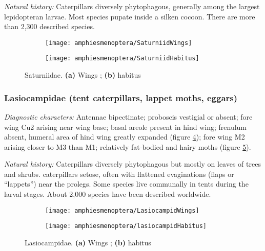 \noindent{}\textit{Natural history:} Caterpillars diversely phytophagous, generally among the largest lepidopteran larvae. Most species pupate inside a silken cocoon. There are more than 2,300 described species.

\begin{figure}[ht!]
    \centering
    \begin{subfigure}[ht!]{0.31\textwidth}
        \texttt{[image: amphiesmenoptera/SaturniidWings]}
        \caption{}
        \label{fig:saturniid1}
    \end{subfigure}
    \hfill
    \begin{subfigure}[ht!]{0.6\textwidth}
        \texttt{[image: amphiesmenoptera/SaturniidHabitus]}
        \caption{}
        \label{fig:saturniid2}
    \end{subfigure}
    \caption{Saturniidae. \textbf{(a)} Wings \citep[Fig. 345]{comstock1918wings}; \textbf{(b)} habitus \citep[][Plate 19, Fig. 1]{druce1900biologia}}\label{fig:saturniids}
\end{figure}

\subsubsection{Lasiocampidae (tent caterpillars, lappet moths, eggars)}
\noindent{}\textit{Diagnostic characters:} Antennae bipectinate; proboscis vestigial or absent; fore wing Cu2 arising near wing base; basal areole present in hind wing; frenulum absent, humeral area of hind wing greatly expanded (figure \ref{fig:lasiocampid1}); fore wing M2 arising closer to M3 than M1; relatively fat-bodied and hairy moths (figure \ref{fig:lasiocampid2}).\vspace{3mm}

\noindent{}\textit{Natural history:} Caterpillars diversely phytophagous but mostly on leaves of trees and shrubs. caterpillars setose, often with flattened evaginations (flaps or ``lappets'') near the prolegs. Some species live communally in tents during the larval stages. About 2,000 species have been described worldwide.

\begin{figure}[ht!]
    \centering
    \begin{subfigure}[ht!]{0.3\textwidth}
        \texttt{[image: amphiesmenoptera/LasiocampidWings]}
        \caption{}
        \label{fig:lasiocampid1}
    \end{subfigure}
    \hfill
    \begin{subfigure}[ht!]{0.5\textwidth}
        \texttt{[image: amphiesmenoptera/lasiocampidHabitus]}
        \caption{}
        \label{fig:lasiocampid2}
    \end{subfigure}
    \caption{Lasiocampidae. \textbf{(a)} Wings \citep[Fig. 69]{comstock1918wings}; \textbf{(b)} habitus \citep[Plate 39, Fig. 9]{bhlitem92348}}\label{fig:lasiocampids}
\end{figure}

